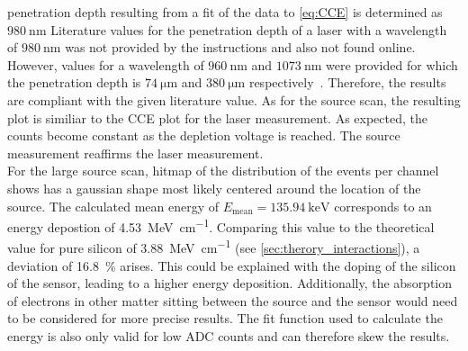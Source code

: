 penetration depth resulting from a fit of the data to \autoref{eq:CCE} is determined as $\qty{980}{\nano\metre}$
Literature values for the penetration depth of a laser with a wavelength of $\qty{980}{\nano\metre}$ was not provided
by the instructions and also not found online. However, values for a wavelength of $\qty{960}{\nano\metre}$ and $\qty{1073}{\nano\metre}$
were provided for which the penetration depth is $\qty{74}{\micro\metre}$ and $\qty{380}{\micro\metre}$ respectively~\cite{SiliconStrip}. Therefore,
the results are compliant with the given literature value. As for the source scan, the resulting plot is similiar 
to the CCE plot for the laser measurement. As expected, the counts become constant as the depletion voltage is reached.
The source measurement reaffirms the laser measurement.\\
For the large source scan, hitmap of the distribution of the events per channel shows has a gaussian shape most likely centered around the location of the source.
The calculated mean energy of $E_{\mathrm{mean}} = \qty{135.94}{\kilo\electronvolt}$ corresponds to an energy depostion of \qty{4.53}{\mega\electronvolt\per\centi\metre}.
Comparing this value to the theoretical value for pure silicon of \qty{3.88}{\mega\electronvolt\per\centi\metre} (see \ref{sec:therory_interactions}), a deviation of \qty{16.8}{\percent} arises.
This could be explained with the doping of the silicon of the sensor, leading to a higher energy deposition. Additionally, the absorption of electrons in other 
matter sitting between the source and the sensor would need to be considered for more precise results. The fit function used to calculate the energy is also only 
valid for low ADC counts and can therefore skew the results.
